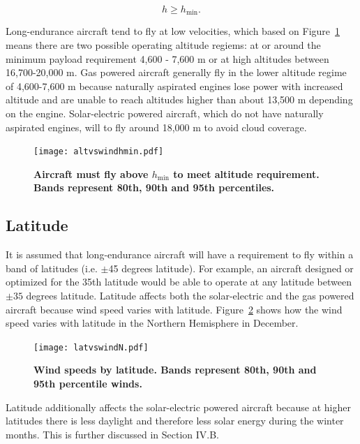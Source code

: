 \begin{equation}
 h \geq h_{\text{min}}.
\end{equation}

Long-endurance aircraft tend to fly at low velocities, which based on Figure~\ref{f:altvswindhmin} means there are two possible operating altitude regiems: at or around the minimum payload requirement 4,600 - 7,600 m or at high altitudes between 16,700-20,000 m. 
Gas powered aircraft generally fly in the lower altitude regime of 4,600-7,600 m because naturally aspirated engines lose power with increased altitude and are unable to reach altitudes higher than about 13,500 m depending on the engine.  
Solar-electric powered aircraft, which do not have naturally aspirated engines, will to fly around 18,000 m to avoid cloud coverage.

\begin{figure}[H]
	\begin{center}
	\texttt{[image: altvswindhmin.pdf]}
    \caption{\textbf{Aircraft must fly above $h_{\text{min}}$ to meet altitude requirement. Bands represent 80th, 90th and 95th percentiles.\cite{wind}}}
	\label{f:altvswindhmin}
	\end{center}
\end{figure}


\subsection{Latitude}

It is assumed that long-endurance aircraft will have a requirement to fly within a band of latitudes (i.e. $\pm$45 degrees latitude).  
For example, an aircraft designed or optimized for the 35th latitude would be able to operate at any latitude between $\pm35$ degrees latitude. 
Latitude affects both the solar-electric and the gas powered aircraft because wind speed varies with latitude. 
Figure~\ref{f:latvswind} shows how the wind speed varies with latitude in the Northern Hemisphere in December. 

\begin{figure}[H]
	\begin{center}
	\texttt{[image: latvswindN.pdf]}
    \caption{\textbf{Wind speeds by latitude.  Bands represent 80th, 90th and 95th percentile winds.\cite{wind} }}
	\label{f:latvswind}
	\end{center}
\end{figure}

Latitude additionally affects the solar-electric powered aircraft because at higher latitudes there is less daylight and therefore less solar energy during the winter months. This is further discussed in Section IV.B.

